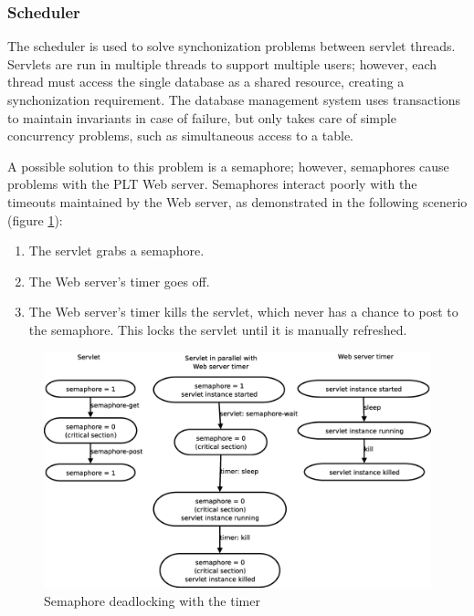 \documentclass[a4paper]{article}
\begin{document}
\subsubsection{Scheduler}\label{subsubsec:scheduler}

The scheduler is used to solve synchonization problems between servlet threads.
Servlets are run in multiple threads to support multiple users; however, each
thread must access the single database as a shared resource, creating a
synchonization requirement. The database management system uses transactions to
maintain invariants in case of failure, but only takes care of simple
concurrency problems, such as simultaneous access to a table.

A possible solution to this problem is a semaphore; however, semaphores cause
problems with the PLT Web server. Semaphores interact poorly with the timeouts
maintained by the Web server, as demonstrated in the following scenerio (figure
\ref{fig:semaphores}):

\begin{enumerate}
\item{The servlet grabs a semaphore.}
\item{The Web server's timer goes off.}
\item{The Web server's timer kills the servlet, which never has a chance to
post to the semaphore. This locks the servlet until it is manually refreshed.}
\end{enumerate}



\begin{figure}[ht]
\centering
\includegraphics[scale=.30]{semaphore-deadlock.eps}
\caption{Semaphore deadlocking with the timer}
\label{fig:semaphores}
\end{figure}
\end{document}
